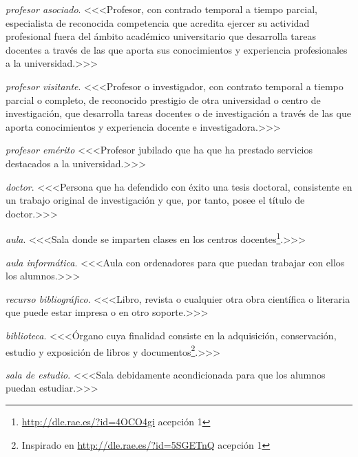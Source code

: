    \item \emph{profesor asociado}. <<<Profesor, con contrado temporal a tiempo
        parcial, especialista de reconocida competencia que acredita ejercer su
        actividad profesional fuera del ámbito académico universitario que
        desarrolla tareas docentes a través de las que aporta sus conocimientos
        y experiencia profesionales a la universidad\cite[artículo 53]{leyUniversidades}.>>>

    \item \emph{profesor visitante}. <<<Profesor o investigador, con contrato
        temporal a tiempo parcial o completo, de reconocido prestigio de otra
        universidad o centro de investigación, que desarrolla tareas docentes o
        de investigación a través de las que aporta conocimientos y experiencia
        docente e investigadora\cite[artículo 54]{leyUniversidades}.>>>

    \item \emph{profesor emérito} <<<Profesor jubilado que ha que ha prestado
        servicios destacados a la universidad\cite[artículo 54bis]{leyUniversidades}.>>>

    \item \emph{doctor}. <<<Persona que ha defendido con éxito una tesis doctoral,
        consistente en un trabajo original de investigación y que, por tanto,
        posee el título de doctor.>>>

    \item \emph{aula}. <<<Sala donde se imparten clases en los centros
        docentes\footnote{\url{http://dle.rae.es/?id=4OCO4gi} acepción 1}.>>>

    \item \emph{aula informática}. <<<Aula con ordenadores para que puedan
        trabajar con ellos los alumnos.>>>

    \item \emph{recurso bibliográfico}. <<<Libro, revista o cualquier otra obra
        científica o literaria que puede estar impresa o en otro soporte.>>>

    \item \emph{biblioteca}. <<<Órgano cuya finalidad consiste en la adquisición,
        conservación, estudio y exposición de libros y
        documentos\footnote{Inspirado en \url{http://dle.rae.es/?id=5SGETnQ}
        acepción 1}.>>>

    \item \emph{sala de estudio}. <<<Sala debidamente acondicionada para que los
        alumnos puedan estudiar.>>> 

{}

